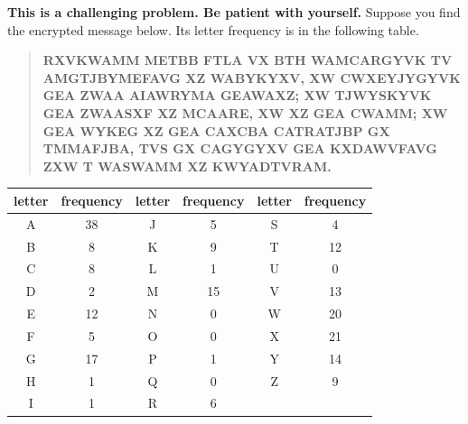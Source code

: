 \documentclass[11pt, oneside]{article}   	%
\begin{document}
	
 \textbf{This is a challenging problem. Be patient with yourself.} Suppose you find the encrypted message below. Its letter frequency is in the following table. 
\begin{quote} \textbf{RXVKWAMM METBB FTLA VX BTH WAMCARGYVK TV AMGTJBYMEFAVG XZ WABYKYXV, XW CWXEYJYGYVK GEA ZWAA AIAWRYMA GEAWAXZ; XW TJWYSKYVK GEA ZWAASXF XZ MCAARE, XW XZ GEA CWAMM; XW GEA WYKEG XZ GEA CAXCBA CATRATJBP GX TMMAFJBA, TVS GX CAGYGYXV GEA KXDAWVFAVG ZXW T WASWAMM XZ KWYADTVRAM.} \end{quote}
	 
	\begin{tabular}{c|c||c|c||c|c}
	letter&frequency&letter&frequency&letter&frequency\\
	\hline \hline
	A&38&J&5&S&4\\
	\hline
	B&8&K&9&T&12\\
	\hline
	C&8&L&1&U&0\\
	\hline
	D&2&M&15&V&13\\
	\hline
	E&12&N&0&W&20\\
	\hline
	F&5&O&0&X&21\\
	\hline
	G&17&P&1&Y&14\\
	\hline
	H&1&Q&0&Z&9\\
	\hline
	I&1&R&6&&\\
	\hline
	\end{tabular}
\end{document}
